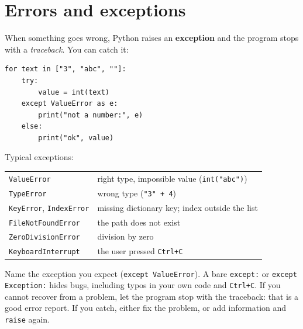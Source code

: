 \section*{Errors and exceptions}
When something goes wrong, Python raises an \textbf{exception} and the program stops with a \emph{traceback}. You can catch it:
\begin{verbatim}
for text in ["3", "abc", ""]:
    try:
        value = int(text)
    except ValueError as e:
        print("not a number:", e)
    else:
        print("ok", value)
\end{verbatim}
\begin{center}
\label{fig:py5_try}
\end{center}
Typical exceptions:
\begin{center}
\renewcommand{\arraystretch}{1.2}
\begin{tabular}{p{4.4cm}p{8.6cm}}
\texttt{ValueError} & right type, impossible value (\verb!int("abc")!)\\
\texttt{TypeError} & wrong type (\verb!"3" + 4!)\\
\texttt{KeyError}, \texttt{IndexError} & missing dictionary key; index outside the list\\
\texttt{FileNotFoundError} & the path does not exist\\
\texttt{ZeroDivisionError} & division by zero\\
\texttt{KeyboardInterrupt} & the user pressed \texttt{Ctrl+C}\\
\end{tabular}
\end{center}
\begin{keyidea}
Name the exception you expect (\texttt{except ValueError}). A bare \texttt{except:} or \texttt{except Exception:} hides bugs, including typos in your own code and \texttt{Ctrl+C}. If you cannot recover from a problem, let the program stop with the traceback: that is a good error report. If you catch, either fix the problem, or add information and \texttt{raise} again.
\end{keyidea}
